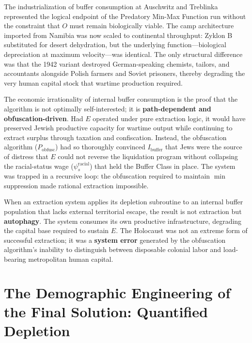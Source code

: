 The industrialization of buffer consumption at Auschwitz and Treblinka represented the logical endpoint of the Predatory Min-Max Function run without the constraint that $O$ must remain biologically viable. The camp architecture imported from Namibia was now scaled to continental throughput: Zyklon B substituted for desert dehydration, but the underlying function---biological depreciation at maximum velocity---was identical. The only structural difference was that the 1942 variant destroyed German-speaking chemists, tailors, and accountants alongside Polish farmers and Soviet prisoners, thereby degrading the very human capital stock that wartime production required.

The economic irrationality of internal buffer consumption is the proof that the algorithm is not optimally self-interested; it is \textbf{path-dependent and obfuscation-driven}. Had $E$ operated under pure extraction logic, it would have preserved Jewish productive capacity for wartime output while continuing to extract surplus through taxation and confiscation. Instead, the obfuscation algorithm ($P_{\text{obfusc}}$) had so thoroughly convinced $I_{\text{buffer}}$ that Jews were the source of distress that $E$ could not reverse the liquidation program without collapsing the racial-status wage ($\psi_s^{\text{racial}}$) that held the Buffer Class in place. The system was trapped in a recursive loop: the obfuscation required to maintain $\min$ suppression made rational extraction impossible.

\begin{keyinsight}
When an extraction system applies its depletion subroutine to an internal buffer population that lacks external territorial escape, the result is not extraction but \textbf{autophagy}. The system consumes its own productive infrastructure, degrading the capital base required to sustain $E$. The Holocaust was not an extreme form of successful extraction; it was a \textbf{system error} generated by the obfuscation algorithm's inability to distinguish between disposable colonial labor and load-bearing metropolitan human capital.
\end{keyinsight}


\section{The Demographic Engineering of the Final Solution: Quantified Depletion}
\label{sec:demographic_engineering}

